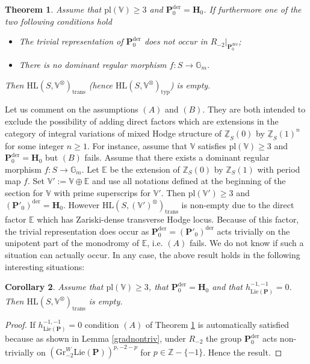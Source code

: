 \documentclass[10pt]{article}
\numberwithin{equation}{subsection}
\theoremstyle{plain}
\newtheorem{theorem}{Theorem}[section]
\newtheorem{corollary}[theorem]{Corollary}
\theoremstyle{definition}
\theoremstyle{remark}
\newcommand{\lie}{\mathrm{Lie}}
\newcommand{\Z}{\mathbb Z}
\newcommand{\V}{\mathbb V}
\newcommand{\mult}{\mathbb G}
\newcommand{\pp}{\mathbf P}
\newcommand{\mon}{\mathbf H}
\newcommand{\HL}{\mathrm{HL}(S, \V^\otimes)}
\newcommand{\gr}{\mathrm{Gr}}
\newcommand{\typ}{\mathrm{typ}}
\newcommand{\der}{\mathrm{der}}
\newcommand{\trans}{\mathrm{trans}}
\begin{document}
\begin{theorem}\label{emptymain}
Assume that $\mathrm{pl}(\V) \geqslant 3$ and $\pp_0^\der = \mon_0$. If furthermore one of the two following conditions hold
\begin{itemize}
\item[(A)] The trivial representation of $\pp_0^\der$ does not occur in $R_{-2}\vert_{\pp_0^\der}$;
\item[(B)] There is no dominant regular morphism $f : S \rightarrow \mult_m$.
\end{itemize}
Then $\HL_\trans$ (hence $\HL_\typ$) is empty.
\end{theorem}
Let us comment on the assumptions $(A)$ and $(B)$. They are both intended to exclude the possibility of adding direct factors which are extensions in the category of integral variations of mixed Hodge structure of $\underline{\Z}_S(0)$ by $\underline{\Z}_S(1)^n$ for some integer $n \geqslant 1$. For instance, assume that $\V$ satisfies $\mathrm{pl}(\V) \geqslant 3$ and $\pp_0^\der = \mon_0$ but $(B)$ fails. Assume that there exists a dominant regular morphism $f : S \rightarrow \mult_m$. Let $\mathbb{E}$ be the extension of $\Z_S(0)$ by $\Z_S(1)$ with period map $f$. Set $\V' := \V \oplus \mathbb{E}$ and use all notations defined at the beginning of the section for $\V$ with prime superscrips for $\V'$. Then $\mathrm{pl}(\V') \geqslant 3$ and $(\pp'_0)^\der = \mon_0$. However $\mathrm{HL}(S, (\V')^\otimes)_\trans$ is non-empty due to the direct factor $\mathbb{E}$ which has Zariski-dense transverse Hodge locus. Because of this factor, the trivial representation does occur as $\pp_0^\der = (\pp'_0)^\der$ acts trivially on the unipotent part of the monodromy of $\mathbb{E}$, i.e. $(A)$ fails. We do not know if such a situation can actually occur. In any case, the above result holds in the following interesting situations:
\begin{corollary}\label{critnum}
Assume that $\mathrm{pl}(\V) \geqslant 3$, that $\pp_0^\der = \mon_0$ and that $h^{-1,-1}_{\lie(\pp)} = 0$. Then $\HL_\trans$ is empty.
\end{corollary}
\begin{proof}
If $h^{-1,-1}_{\lie(\pp)} = 0$ condition $(A)$ of Theorem \ref{emptymain} is automatically satisfied because as shown in Lemma \ref{gradnontriv}, under $R_{-2}$ the group $\pp_0^\der$ acts non-trivially on $(\gr_{-2}^W \lie(\pp))^{p,-2 - p}$ for $p \in \Z -\{-1\}$. Hence the result.
\end{proof}
\end{document}
